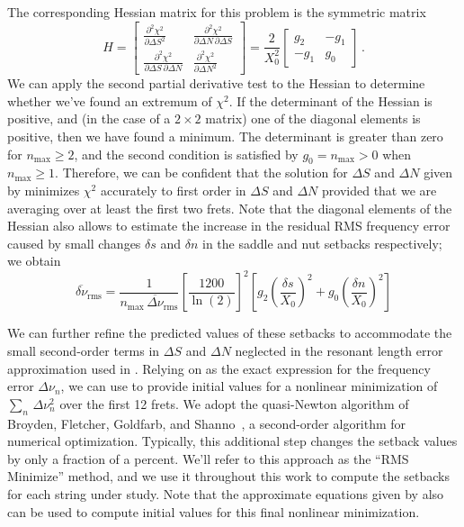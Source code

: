 The corresponding Hessian matrix for this problem is the symmetric matrix
 \begin{equation}
H = \begin{bmatrix}
      \frac{\partial^2 \chi^2}{\partial \Delta S^2} & \frac{\partial^2 \chi^2}{\partial \Delta N\, \partial \Delta S} \\
      \frac{\partial^2 \chi^2}{\partial \Delta S\, \partial \Delta N} & \frac{\partial^2 \chi^2}{\partial \Delta N^2}
    \end{bmatrix}
  = \frac{2}{X_0^2} \begin{bmatrix}
      g_2 & -g_1 \\
      -g_1 & g_0
    \end{bmatrix}\, .
 \end{equation}
We can apply the second partial derivative test to the Hessian to determine whether we've found an extremum of $\chi^2$. If the determinant of the Hessian is positive, and (in the case of a $2 \times 2$ matrix) one of the diagonal elements is positive, then we have found a minimum. The determinant is greater than zero for $n_\text{max} \ge 2$, and the second condition is satisfied by $g_0 = n_\text{max} > 0$ when $n_\text{max} \ge 1$. Therefore, we can be confident that the solution for $\Delta S$ and $\Delta N$ given by  minimizes $\chi^2$ accurately to first order in $\Delta S$ and $\Delta N$ provided that we are averaging over at least the first two frets. Note that the diagonal elements of the Hessian also allows to estimate the increase in the residual RMS frequency error caused by small changes $\delta s$ and $\delta n$ in the saddle and nut setbacks respectively; we obtain
\begin{equation}
  \overline{\delta \nu}_\text{rms} = \frac{1}{n_\text{max}\, \overline{\Delta \nu}_\text{rms}} \left[ \frac{1200}{\ln(2)} \right]^2 \left[ g_2 \left(\frac{\delta s}{X_0}\right)^2 + g_0 \left(\frac{\delta n}{X_0}\right)^2\right]
\end{equation}

We can further refine the predicted values of these setbacks to accommodate the small second-order terms in $\Delta S$ and $\Delta N$ neglected in the resonant length error approximation used in . Relying on  as the exact expression for the frequency error $\Delta \nu_n$, we can use  to provide initial values for a nonlinear minimization of $\sum_n\, \Delta \nu_n^2$ over the first 12 frets. We adopt the quasi-Newton algorithm of Broyden, Fletcher, Goldfarb, and Shanno~\cite{ref:nocedal2006no}, a second-order algorithm for numerical optimization. Typically, this additional step changes the setback values by only a fraction of a percent. We'll refer to this approach as the ``RMS Minimize'' method, and we use it throughout this work to compute the setbacks for each string under study. Note that the approximate equations given by  also can be used to compute initial values for this final nonlinear minimization.

